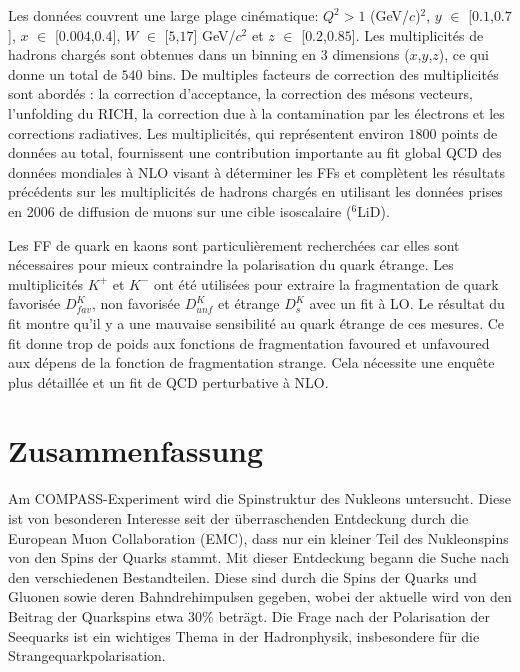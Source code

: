 Les données couvrent une large plage cinématique: $Q^2 > 1$ (GeV/$c$)$^2$, $y$ $\in$ [$0.1$,$0.7$], $x$ $\in$ [$0.004$,$0.4$], $W$ $\in$ [$5$,$17$] GeV/$c^2$ et $z$ $\in$ [$0.2$,$0.85$]. Les multiplicités de hadrons chargés sont obtenues dans un binning en $3$ dimensions ($x$,$y$,$z$), ce qui donne un total de $540$ bins. De multiples facteurs de correction des multiplicités sont abordés : la correction d'acceptance, la correction des mésons vecteurs, l'unfolding du RICH, la correction due à la contamination par les électrons et les corrections radiatives. Les multiplicités, qui représentent environ $1800$ points de données au total, fournissent une contribution importante au fit global QCD des données mondiales à NLO visant à déterminer les FFs et complètent les résultats précédents sur les multiplicités de hadrons chargés en utilisant les données prises en 2006 de diffusion de muons sur une cible isoscalaire ($^6$LiD).

Les FF de quark en kaons sont particulièrement recherchées car elles sont nécessaires pour mieux contraindre la polarisation du quark étrange. Les multiplicités $K^+$ et $K^-$ ont été utilisées pour extraire la fragmentation de quark favorisée $D^{K}_{fav}$, non favorisée $D^{K}_{unf}$ et étrange $D^{K}_{s}$ avec un fit à LO. Le résultat du fit montre qu'il y a une mauvaise sensibilité au quark étrange de ces mesures. Ce fit donne trop de poids aux fonctions de fragmentation favoured et unfavoured aux dépens de la fonction de fragmentation strange. Cela nécessite une enquête plus détaillée et un fit de QCD perturbative à NLO.


\newpage

\chapter*{Zusammenfassung}

Am COMPASS-Experiment wird die Spinstruktur des Nukleons untersucht. Diese ist von besonderen Interesse seit der überraschenden Entdeckung durch die European Muon Collaboration (EMC), dass nur ein kleiner Teil des Nukleonspins von den Spins der Quarks stammt. Mit dieser Entdeckung begann die Suche nach den verschiedenen Bestandteilen. Diese sind durch die Spins der Quarks und Gluonen sowie deren Bahndrehimpulsen gegeben, wobei der aktuelle wird von den Beitrag der Quarkspins etwa 30\% beträgt. Die Frage nach der Polarisation der Seequarks ist ein wichtiges Thema in der Hadronphysik, insbesondere für die Strangequarkpolarisation.

